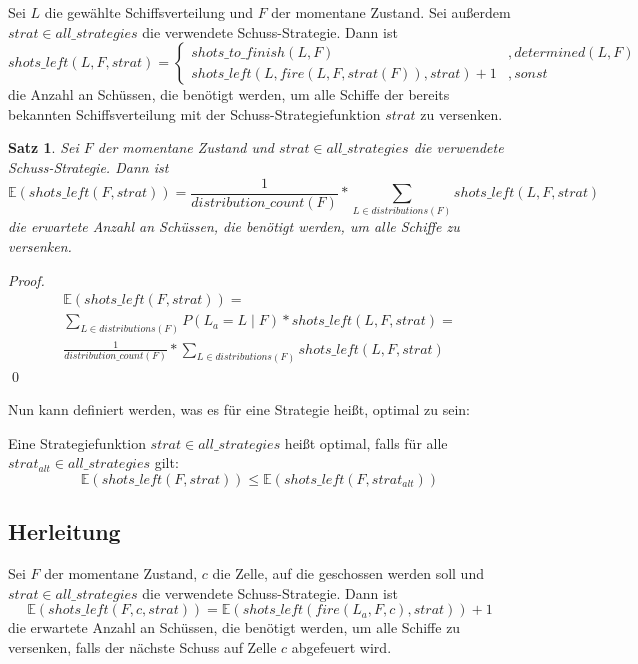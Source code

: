 \documentclass[a4paper,12pt]{llncs}
\numberwithin{equation}{section}
\newtheorem{satz}{Satz}
\begin{document}
\begin{definition}
Sei $L$ die gewählte Schiffsverteilung und $F$ der momentane Zustand.
Sei außerdem $strat \in all\_strategies$ die verwendete Schuss-Strategie.
Dann ist
\[
shots\_left(L, F, strat)=
  \begin{cases} 
  	shots\_to\_finish(L, F) & ,determined(L, F) \\
      shots\_left(L, fire(L, F, strat(F)), strat) + 1 & ,sonst
   \end{cases}
\]
die Anzahl an Schüssen, die benötigt werden, um alle Schiffe der bereits bekannten Schiffsverteilung mit der Schuss-Strategiefunktion $strat$ zu versenken.
\end{definition}

\begin{satz}
Sei $F$ der momentane Zustand und $strat \in all\_strategies$ die verwendete Schuss-Strategie.
Dann ist
\[
\mathds{E}(shots\_left(F, strat))=\frac{1}{distribution\_count(F)} * \sum_{L \in distributions(F)}{shots\_left(L, F, strat)}
\]
die erwartete Anzahl an Schüssen, die benötigt werden, um alle Schiffe zu versenken.
\end{satz}

\begin{proof}
\begin{align}
\mathds{E}(shots\_left(F, strat))=\\
\sum_{L \in distributions(F)}{P(L_a= L \mid F) * shots\_left(L, F, strat)} =\\
\frac{1}{distribution\_count(F)} * \sum_{L \in distributions(F)}{shots\_left(L, F, strat)}
\end{align}
\qed
\end{proof}

Nun kann definiert werden, was es für eine Strategie heißt, optimal zu sein:
\begin{definition}
Eine Strategiefunktion $strat \in all\_strategies$ heißt optimal, falls für alle $strat_{alt} \in all\_strategies$ gilt:
\[
\mathds{E}(shots\_left(F, strat)) \leq \mathds{E}(shots\_left(F, strat_{alt}))
\]
\end{definition}

\subsection{Herleitung}

\begin{lemma}
Sei $F$ der momentane Zustand, $c$ die Zelle, auf die geschossen werden soll und $strat \in all\_strategies$ die verwendete Schuss-Strategie.
Dann ist
\[
\mathds{E}(shots\_left(F, c, strat))=\mathds{E}(shots\_left(fire(L_a, F, c), strat)) + 1
\]
die erwartete Anzahl an Schüssen, die benötigt werden, um alle Schiffe zu versenken, falls der nächste Schuss auf Zelle $c$ abgefeuert wird.
\end{lemma}
\end{document}
